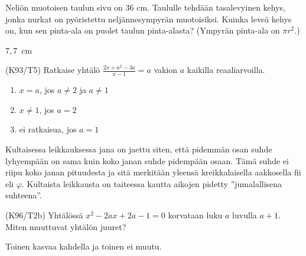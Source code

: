 \begin{tehtavasivu}
\begin{tehtava} %
Neliön muotoisen taulun sivu on 36 cm. Taululle tehdään tasalevyinen kehys, jonka
nurkat on pyöristettu neljännesympyrän muotoisiksi. Kuinka leveä kehys on, kun sen
pinta-ala on puolet taulun pinta-alasta? (Ympyrän pinta-ala on $\pi r^2$.)
    \begin{vastaus}
     $7,7$~cm
    \end{vastaus}
\end{tehtava}

\begin{tehtava}
(K93/T5) Ratkaise yhtälö
        $\frac{2x+a^2-3a}{x-1}=a$ vakion $a$ kaikilla reaaliarvoilla.
\begin{vastaus}
        \begin{enumerate}
         \item{$x=a$, jos $a \neq 2$ ja $a \neq 1$}
         \item{$x\neq 1$, jos $a=2$}
         \item{ei ratkaisua, jos $a=1$}
        \end{enumerate}
    \end{vastaus}
\end{tehtava}

\begin{tehtava}
    Kultaisessa leikkauksessa jana on jaettu siten, että pidemmän osan suhde lyhyempään on sama kuin koko janan suhde pidempään osaan. Tämä suhde ei riipu koko janan pituudesta ja sitä merkitään yleensä kreikkalaisella aakkosella fii eli $\varphi$. Kultaista leikkausta on taiteessa kautta aikojen pidetty ''jumalallisena suhteena''.
		\begin{alakohdat}
        \end{alakohdat}
    \begin{vastaus}
        \begin{alakohdat}
        \end{alakohdat}
    \end{vastaus}
\end{tehtava}

\begin{tehtava}
(K96/T2b) Yhtälössä $x^2-2ax+2a-1=0$ korvataan luku $a$ luvulla $a+1$. Miten muuttuvat yhtälön juuret?
\begin{vastaus}
     Toinen kasvaa kahdella ja toinen ei muutu.
    \end{vastaus}
\end{tehtava}


\end{tehtavasivu}
